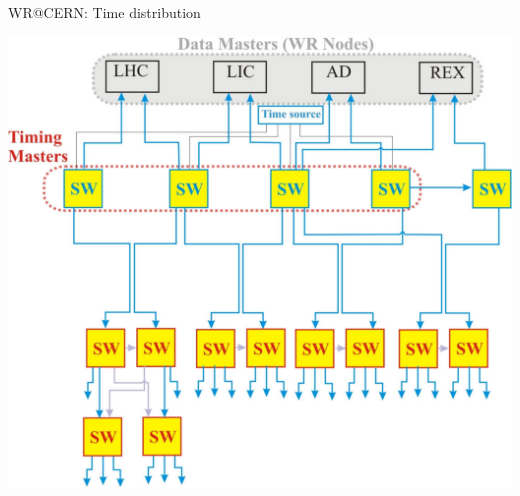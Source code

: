 \documentclass[compress,red]{beamer}
\begin{document}
\begin{frame}{WR@CERN: Time distribution}


      \begin{center}
	\includegraphics[width=.7\textwidth]{applications/CERN/NT-timing_v2.pdf}
      \end{center}  

\end{frame}
\end{document}

